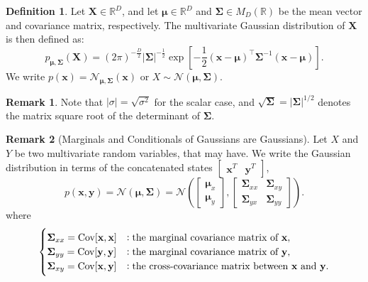 \documentclass[12pt,openany]{book}
\theoremstyle{definition}
\newtheorem{definition}{Definition}[chapter]
\newtheorem{remark}{Remark}[chapter]
\newcommand{\of}[1]{\left( #1 \right)}
\newcommand{\Cov}{\textnormal{Cov}}
\newcommand{\mvec}[1]{\boldsymbol{#1}}
\renewcommand{\vec}[1]{\textbf{#1}}
\begin{document}
	\begin{tcolorbox}[colframe=defcolor,title={\color{white}\bf Multivariate Gaussian Distribution}]
		\begin{definition}
			Let \( \vec{X} \in \mathbb{R}^D \), and let \( \mvec{\mu} \in \mathbb{R}^D \) and \( \mvec{\Sigma} \in M_{D}(\mathbb{R}) \) be the mean vector and covariance matrix, respectively. The multivariate Gaussian distribution of \( \vec{X} \) is then defined as:
			\[
			p_{\mvec{\mu}, \mvec{\Sigma}}(\vec{X}) = (2\pi)^{-\frac{D}{2}}|\mvec{\Sigma}|^{-\frac{1}{2}}\exp\left[-\frac{1}{2}(\vec{x} - \mvec{\mu})^\top\mvec{\Sigma}^{-1}(\vec{x} - \mvec{\mu})\right].
			\] We write $p(\vec{x})=\mathcal{N}_{\mvec{\mu},\mvec{\Sigma}}(\vec{x})$ or $X\sim\mathcal{N}(\mvec{\mu},\mvec{\Sigma})$.
		\end{definition}
	\end{tcolorbox}
	\begin{remark}
		Note that \( |\sigma| = \sqrt{\sigma^2} \) for the scalar case, and \( \sqrt{\mvec{\Sigma}} = |\mvec{\Sigma}|^{1/2} \) denotes the matrix square root of the determinant of \( \mvec{\Sigma} \).
	\end{remark}
	\begin{remark}[Marginals and Conditionals of Gaussians are Gaussians]
		Let $X$ and $Y$ be two multivariate random variables, that may have. We write the Gaussian distribution in terms of the concatenated states $\begin{bmatrix}
			\vec{x}^T&\vec{y}^T
		\end{bmatrix}$, \[
		p(\vec{x},\vec{y})=\mathcal{N}(\mvec{\mu},\mvec{\Sigma})=\mathcal{N}\of{\begin{bmatrix}
				\mvec{\mu}_x\\ \mvec{\mu}_y
			\end{bmatrix},\begin{bmatrix}
				\mvec{\Sigma}_{xx} & \mvec{\Sigma}_{xy}\\ \mvec{\Sigma}_{yx} & \mvec{\Sigma}_{yy}
		\end{bmatrix}}.
		\] where \[
		\begin{cases}
			\mvec{\Sigma}_{xx}=\Cov[\vec{x},\vec{x}] &:\text{the marginal covariance matrix of $\vec{x}$},\\
			\mvec{\Sigma}_{yy}=\Cov[\vec{y},\vec{y}] &:\text{the marginal covariance matrix of $\vec{y}$},\\
			\mvec{\Sigma}_{xy}=\Cov[\vec{x},\vec{y}] &:\text{the cross-covariance matrix between $\vec{x}$ and $\vec{y}$}.
		\end{cases}
		\]
	\end{remark}
\end{document}
